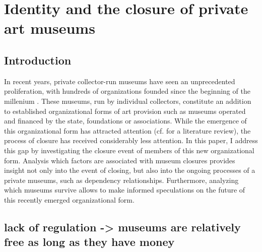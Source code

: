 \documentclass[12pt]{article}
\author{Johannes }
\date{\today}
\title{}
\begin{document}
\section*{Identity and the closure of private art museums}



\subsection*{Introduction}


In recent years, private collector-run museums have seen an unprecedented proliferation, with hundreds of organizations founded since the beginning of the millenium \parencite{Velthuis_etal_2023_boom,LarrysList_2015_report}.
These museums, run by individual collectors, constitute an addition to established organizational forms of art provision such as museums operated and financed by the state, foundations or associations.
While the emergence of this organizational form has attracted attention (cf. \cite{Kolbe_etal_2022_privatemuseum} for a literature review), the process of closure has received considerably less attention.
In this paper, I address this gap by investigating the closure event of members of this new organizational form.
Analysis which factors are associated with museum closures provides insight not only into the event of closing, but also into the ongoing processes of a private museums, such as dependency relationships.
Furthermore, analyzing which museums survive allows to make informed speculations on the future of this recently emerged organizational form.









\subsection*{lack of regulation -> museums are relatively free as long as they have money}
\end{document}
